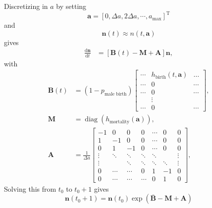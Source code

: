 \documentclass{article}
\renewcommand{\vec}[1]{\mathbf{#1}}
\newcommand{\mat}[1]{\mathbf{#1}}
\newcommand{\md}{\mathrm{d}}
\newcommand{\mT}{\mathrm{T}}
\begin{document}
Discretizing in $a$ by setting
\begin{equation}
  \label{eq:11}
  \vec{a} = \left[0, \Delta a, 2 \Delta a, \cdots, a_{\text{max}} \right]^{\mT}
\end{equation}
and
\begin{equation}
  \vec{n}(t) \approx n(t, \vec{a})
\end{equation}
gives
\begin{equation}
  \begin{split}
    \frac{\md \vec{n}}{\md t} &=
    \left[\mat{B}(t)
      - \mat{M}
      + \mat{A}\right] \vec{n},
  \end{split}
\end{equation}
with
\begin{equation}
  \begin{split}
    \mat{B}(t)
    &=
    (1 - p_{\text{male birth}})
    \begin{bmatrix}
      \cdots & h_{\text{birth}}(t, \vec{a}) & \dots
      \\
      \cdots & 0 & \cdots
      \\
      \cdots & 0 & \cdots
      \\
      & \vdots &
      \\
      \cdots & 0 & \cdots
    \end{bmatrix},
    \\
    \mat{M} &=
    \operatorname{diag}\left(h_{\text{mortality}}(\vec{a})\right),
    \\
    \mat{A} &=
    \frac{1}{\Delta a}
    \begin{bmatrix}
      -1 & 0 & 0 & 0 & \cdots & 0 & 0
      \\
      1 & -1 & 0 & 0 & \cdots & 0 & 0
      \\
      0 & 1 & -1 & 0 & \cdots & 0 & 0
      \\
      \vdots & \ddots & \ddots & \ddots & \ddots &  & \vdots
      \\
      \vdots &  & \ddots & \ddots & \ddots & \ddots & \vdots
      \\
      0  & \cdots & \cdots & 0 & 1 & - 1 & 0
      \\
      0  & \cdots & \cdots & \cdots & 0 & 1 & 0
    \end{bmatrix},
  \end{split}
\end{equation}
Solving this from $t_0$ to $t_0 + 1$ gives
\begin{equation}
  \vec{n}(t_0 + 1) = \vec{n}(t_0)
  \exp\left(\bar{\mat{B}} - \mat{M} + \mat{A}\right)
\end{equation}
\end{document}

